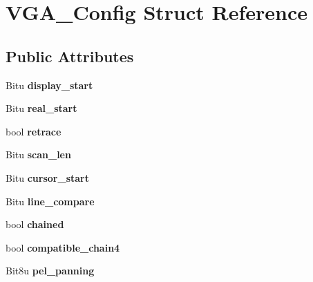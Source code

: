 \hypertarget{structVGA__Config}{\section{V\-G\-A\-\_\-\-Config Struct Reference}
\label{structVGA__Config}
}
\subsection*{Public Attributes}
\begin{DoxyCompactItemize}
\item 
\hypertarget{structVGA__Config_a5293b44774bd31cda5e0b044c3e2b126}{Bitu {\bfseries display\-\_\-start}}\label{structVGA__Config_a5293b44774bd31cda5e0b044c3e2b126}

\item 
\hypertarget{structVGA__Config_abe32bdd778f0100c25133a156c68ba08}{Bitu {\bfseries real\-\_\-start}}\label{structVGA__Config_abe32bdd778f0100c25133a156c68ba08}

\item 
\hypertarget{structVGA__Config_af50f74923e0bc8f7e29a6c131a1e835c}{bool {\bfseries retrace}}\label{structVGA__Config_af50f74923e0bc8f7e29a6c131a1e835c}

\item 
\hypertarget{structVGA__Config_a0475ac4a2401fb3aced4cd3fdf306dde}{Bitu {\bfseries scan\-\_\-len}}\label{structVGA__Config_a0475ac4a2401fb3aced4cd3fdf306dde}

\item 
\hypertarget{structVGA__Config_a366ba6eba7835ee30d873b7ae38efedc}{Bitu {\bfseries cursor\-\_\-start}}\label{structVGA__Config_a366ba6eba7835ee30d873b7ae38efedc}

\item 
\hypertarget{structVGA__Config_a3160fcf767aaf3fc1a40a1a9b0b9789e}{Bitu {\bfseries line\-\_\-compare}}\label{structVGA__Config_a3160fcf767aaf3fc1a40a1a9b0b9789e}

\item 
\hypertarget{structVGA__Config_a8507c0d700555dc741fbfd9e330cd535}{bool {\bfseries chained}}\label{structVGA__Config_a8507c0d700555dc741fbfd9e330cd535}

\item 
\hypertarget{structVGA__Config_a61326cde4796a75756cf9304f13d7835}{bool {\bfseries compatible\-\_\-chain4}}\label{structVGA__Config_a61326cde4796a75756cf9304f13d7835}

\item 
\hypertarget{structVGA__Config_adaea7a9c92bb41b338c037fb264a6d38}{Bit8u {\bfseries pel\-\_\-panning}}\label{structVGA__Config_adaea7a9c92bb41b338c037fb264a6d38}


\end{DoxyCompactItemize}
